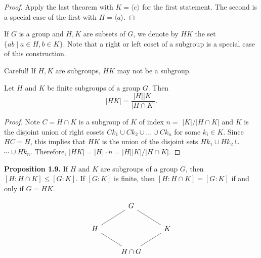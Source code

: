 \documentclass[11pt,a4paper]{article}
\begin{document}
\begin{proof}
    Apply the last theorem with $K=\langle e\rangle$ for the first statement. The second is a special case of the first with $H=\langle a\rangle$.
\end{proof}


If $G$ is a group and $H, K$ are subsets of $G$, we denote by $H K$ the set $\{a b \mid a \in H, b \in K\}$. Note that a right or left coset of a subgroup is a special case of this construction.

\begin{rem}
    Careful! If $H, K$ are subgroups, $H K$ may not be a subgroup.
\end{rem}

\begin{teo}
    Let \(H\) and \(K\) be finite subgroups of a group \(G\). Then \[|HK| =  \frac{|H||K|}{|H\cap K|}.\]
\end{teo}

\begin{proof}
    Note $C=H \cap K$ is a subgroup of $K$ of index $n=$ $|K| /|H \cap K|$ and $K$ is the disjoint union of right cosets $C k_1 \cup C k_2 \cup \ldots \cup C k_n$ for some $k_i \in K$. Since $H C=H$, this implies that $H K$ is the   union of the disjoint sets $H k_1 \cup H k_2 \cup$ $\cdots \cup H k_n$. Therefore, $|H K|=|H| \cdot n=|H||K| /|H \cap K|$.
\end{proof}


\noindent
\begin{minipage}[c]{0.5\textwidth}
\textbf{Proposition 1.9.} If \( H \) and \( K \) are subgroups of a group \( G \), then \( [H : H \cap K] \leq [G : K] \). If \( [G : K] \) is finite, then \( [H : H \cap K] = [G : K] \) if and only if \( G = HK \).
\end{minipage}%
\hfill
\begin{minipage}[c]{0.45\textwidth}
\[\begin{tikzcd}
    & G \arrow[ld, no head] \arrow[rd, no head] &                       \\
H \arrow[rd, no head] &                                           & K \arrow[ld, no head] \\
    & H\cap G                                   &                      
\end{tikzcd}\]
\end{minipage}
\end{document}
